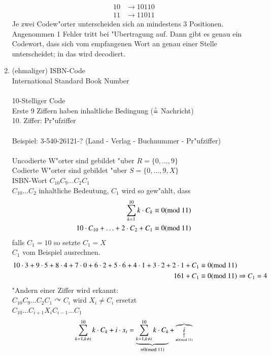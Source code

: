 \begin{enumerate}
\begin{align*}
			10 &\rightarrow 10110\\
			11 &\rightarrow 11011
		\end{align*}
		Je zwei Codew"orter unterscheiden sich an mindestens 3 Positionen.\\
		Angenommen 1 Fehler tritt bei "Ubertragung auf. Dann gibt es genau ein Codewort, dass sich vom empfangenen Wort an genau einer Stelle unterscheidet; in das wird decodiert.
	\item (ehmaliger) ISBN-Code \\
		International Standard Book Number\\
		\\
		10-Stelliger Code\\
		Erste 9 Ziffern haben inhaltliche Bedingung ($\stackrel{\scriptscriptstyle\wedge}{=}$ Nachricht)\\
		10. Ziffer: Pr"ufziffer\\
		\\
		Beispiel: 3-540-26121-? (Land - Verlag - Buchnummer - Pr"ufziffer)\\
		\\
		Uncodierte W"orter sind gebildet "uber $R=\lbrace 0, \ldots, 9\rbrace$\\
		Codierte W"orter sind gebildet "uber $S=\lbrace 0, \ldots, 9, X\rbrace$\\
		ISBN-Wort $C_{10}C_9\ldots C_2C_1$\\
		$C_{10}\ldots C_2$ inhaltliche Bedeutung, $C_1$ wird so gew"ahlt, dass
		\begin{align*}
			\sum^{10}_{k=1} k \cdot C_k &\equiv 0 (\text{mod }11)\\
			10\cdot C_{10}+\ldots + 2\cdot C_2 + C_1 &\equiv 0(\text{mod }11)
		\end{align*}
		falls $C_1 = 10$ so setzte $C_1 = X$\\
		$C_1$ vom Beispiel ausrechnen.
		\begin{align*}
			10\cdot 3+9\cdot 5+8\cdot 4+7\cdot 0+6\cdot 2+5\cdot 6+4\cdot 1+3\cdot 2+2\cdot 1+C_1 &\equiv 0 (\text{mod }11)\\
			161 + C_1 &\equiv 0 (\text{mod }11) \Rightarrow C_1 = 4
		\end{align*}
		"Andern einer Ziffer wird erkannt:\\
		$C_{10} C_9\ldots C_2 C_1 \curvearrowright C_i$ wird $X_i \neq C_i$ ersetzt\\
		$C_{10} \ldots C_{i+1} X_i C_{i-1} \ldots C_1$
		\[
			\sum^{10}_{k=1, k \neq i} k \cdot C_k + i \cdot x_i = 
			\underbrace{\sum^{10}_{k=1, k \neq i} k \cdot C_k}_{\equiv 0 (\md{11})}+
			\overbrace{
					\underset{\underset{\nequiv 0 (\md{11})}{\uparrow}}{i} 
}\]
\end{enumerate}
